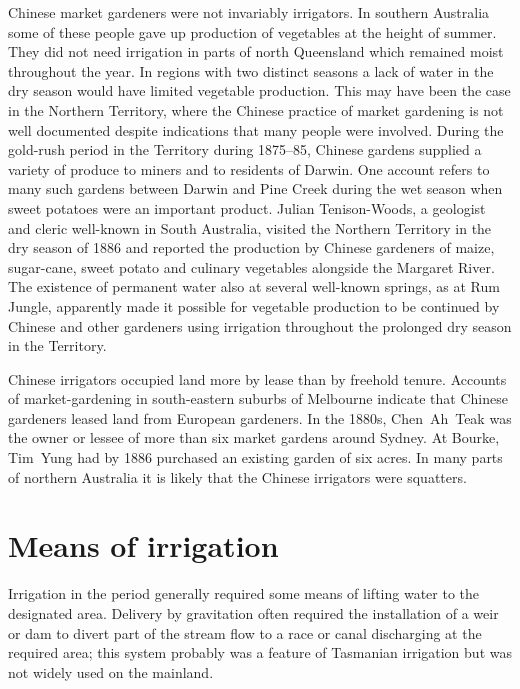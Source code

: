 Chinese market gardeners were not invariably irrigators.  In southern
Australia some of these people gave up production of vegetables at the
height of summer.  They did not need irrigation in parts of north
Queensland  which remained moist throughout the
year.  In regions with two distinct seasons a lack of water in the dry
season would have limited vegetable production.  This may have been
the case in the Northern Territory,  where
the Chinese practice of market gardening is not well documented
despite indications that many people were involved.  During the
gold-rush period in the Territory during 1875--85, Chinese gardens
supplied a variety of produce to miners and to residents of Darwin.
One account refers to many such gardens between Darwin 
and Pine Creek  during the wet season when sweet
potatoes were an important product.  Julian Tenison-Woods,
 a geologist
and cleric well-known in South Australia, visited the Northern
Territory in the dry season of 1886 and reported the production by
Chinese gardeners of maize, sugar-cane, sweet potato and culinary
vegetables alongside the Margaret River.  The
existence of permanent water also at several well-known springs, as at
Rum Jungle,  apparently made it possible for
vegetable production to be continued by Chinese and other gardeners
using irrigation throughout the prolonged dry season in the
Territory.

Chinese  irrigators occupied land more by lease than by
freehold ten\-ure.  Accounts of market-gardening in south-eastern
suburbs of Melbourne  indicate that Chinese
gardeners leased land from European gardeners.  In the 1880s,
Chen~Ah~Teak
 was the owner or lessee of more than six market
gardens around Sydney.  At Bourke, Tim~Yung  had by
1886 purchased an existing garden of six acres.  In many parts of
northern Australia it is likely that the Chinese irrigators were
squatters.

\section*{Means of irrigation}

Irrigation in the period generally required some means of lifting
water to the designated area.  Delivery by gravitation  often required the installation of a weir or dam 
 to divert part
of the stream flow to a race or canal discharging at the required
area; this system probably was a feature of Tasmanian irrigation but
was not widely used on the mainland.

